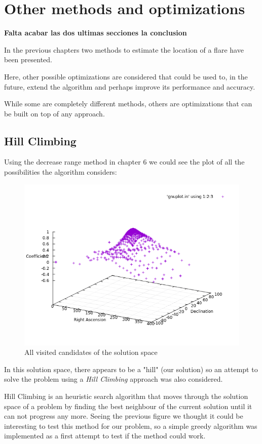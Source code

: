 \chapter{Other methods and optimizations}

\textbf{Falta acabar las dos ultimas secciones la conclusion}

In the previous chapters two methods to estimate the location of a flare have been presented. 

Here, other possible optimizations are considered that could be used to, in the future, extend the algorithm and perhaps improve its performance and accuracy.

While some are completely different methods, others are optimizations that can be built on top of any approach.

\section{Hill Climbing}

Using the decrease range method in chapter 6 we could see the plot of all the possibilities the algorithm considers:

\begin{figure}[!htb]
	\begin{centering}
		\includegraphics[width=0.5\linewidth]{images/ch6/hillClimbing/resultsAll.png}
		\caption{All visited candidates of the solution space}
		\label{fig:solutionSpace}
	\end{centering}
\end{figure}

In this solution space, there appears to be a "hill" (our solution) so an attempt to solve the problem using a \textit{Hill Climbing} approach was also considered.

Hill Climbing is an heuristic search algorithm that moves through the solution space of a problem by finding the best neighbour of the current solution until it can not progress any more. Seeing the previous figure we thought it could be interesting to test this method for our problem, so a simple greedy algorithm was implemented as a first attempt to test if the method could work.

